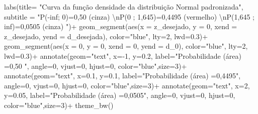 \documentclass[
]{book}
\newenvironment{Shaded}{\begin{snugshade}}{\end{snugshade}}
\newcommand{\AttributeTok}[1]{\textcolor[rgb]{0.77,0.63,0.00}{#1}}
\newcommand{\DecValTok}[1]{\textcolor[rgb]{0.00,0.00,0.81}{#1}}
\newcommand{\FloatTok}[1]{\textcolor[rgb]{0.00,0.00,0.81}{#1}}
\newcommand{\FunctionTok}[1]{\textcolor[rgb]{0.00,0.00,0.00}{#1}}
\newcommand{\NormalTok}[1]{#1}
\newcommand{\SpecialCharTok}[1]{\textcolor[rgb]{0.00,0.00,0.00}{#1}}
\newcommand{\StringTok}[1]{\textcolor[rgb]{0.31,0.60,0.02}{#1}}
\begin{document}
\begin{Shaded}
\begin{Highlighting}[]
  \FunctionTok{labs}\NormalTok{(}\AttributeTok{title=} 
      \StringTok{"Curva da função densidade da distribuição Normal padronizada"}\NormalTok{, }
      \AttributeTok{subtitle =} \StringTok{"P({-}inf; 0)=0,50 (cinza) }\SpecialCharTok{\textbackslash{}n}\StringTok{P(0 ; 1,645)=0,4495 (vermelho) }\SpecialCharTok{\textbackslash{}n}\StringTok{P(1,645 ; inf)=0,0505 (cinza) "}\NormalTok{)}\SpecialCharTok{+}
  \FunctionTok{geom\_segment}\NormalTok{(}\FunctionTok{aes}\NormalTok{(}\AttributeTok{x =}\NormalTok{ z\_desejado, }\AttributeTok{y =} \DecValTok{0}\NormalTok{, }\AttributeTok{xend =}\NormalTok{ z\_desejado, }\AttributeTok{yend =}\NormalTok{ d\_desejada), }\AttributeTok{color=}\StringTok{"blue"}\NormalTok{, }\AttributeTok{lty=}\DecValTok{2}\NormalTok{, }\AttributeTok{lwd=}\FloatTok{0.3}\NormalTok{)}\SpecialCharTok{+}
  \FunctionTok{geom\_segment}\NormalTok{(}\FunctionTok{aes}\NormalTok{(}\AttributeTok{x =} \DecValTok{0}\NormalTok{, }\AttributeTok{y =} \DecValTok{0}\NormalTok{, }\AttributeTok{xend =} \DecValTok{0}\NormalTok{, }\AttributeTok{yend =}\NormalTok{ d\_0), }\AttributeTok{color=}\StringTok{"blue"}\NormalTok{, }\AttributeTok{lty=}\DecValTok{2}\NormalTok{, }\AttributeTok{lwd=}\FloatTok{0.3}\NormalTok{)}\SpecialCharTok{+}
  \FunctionTok{annotate}\NormalTok{(}\AttributeTok{geom=}\StringTok{"text"}\NormalTok{, }\AttributeTok{x=}\SpecialCharTok{{-}}\DecValTok{1}\NormalTok{, }\AttributeTok{y=}\FloatTok{0.2}\NormalTok{, }\AttributeTok{label=}\StringTok{"Probabilidade (área) =0,50 "}\NormalTok{, }\AttributeTok{angle=}\DecValTok{0}\NormalTok{, }\AttributeTok{vjust=}\DecValTok{0}\NormalTok{, }\AttributeTok{hjust=}\DecValTok{0}\NormalTok{, }\AttributeTok{color=}\StringTok{"blue"}\NormalTok{,}\AttributeTok{size=}\DecValTok{3}\NormalTok{)}\SpecialCharTok{+}
  \FunctionTok{annotate}\NormalTok{(}\AttributeTok{geom=}\StringTok{"text"}\NormalTok{, }\AttributeTok{x=}\FloatTok{0.1}\NormalTok{, }\AttributeTok{y=}\FloatTok{0.1}\NormalTok{, }\AttributeTok{label=}\StringTok{"Probabilidade (área) =0,4495"}\NormalTok{, }\AttributeTok{angle=}\DecValTok{0}\NormalTok{, }\AttributeTok{vjust=}\DecValTok{0}\NormalTok{, }\AttributeTok{hjust=}\DecValTok{0}\NormalTok{, }\AttributeTok{color=}\StringTok{"blue"}\NormalTok{,}\AttributeTok{size=}\DecValTok{3}\NormalTok{)}\SpecialCharTok{+}
  \FunctionTok{annotate}\NormalTok{(}\AttributeTok{geom=}\StringTok{"text"}\NormalTok{, }\AttributeTok{x=}\DecValTok{2}\NormalTok{, }\AttributeTok{y=}\FloatTok{0.05}\NormalTok{, }\AttributeTok{label=}\StringTok{"Probabilidade (área) =0,0505"}\NormalTok{, }\AttributeTok{angle=}\DecValTok{0}\NormalTok{, }\AttributeTok{vjust=}\DecValTok{0}\NormalTok{, }\AttributeTok{hjust=}\DecValTok{0}\NormalTok{, }\AttributeTok{color=}\StringTok{"blue"}\NormalTok{,}\AttributeTok{size=}\DecValTok{3}\NormalTok{)}\SpecialCharTok{+}
  \FunctionTok{theme\_bw}\NormalTok{()}
\end{Highlighting}
\end{Shaded}
\end{document}
